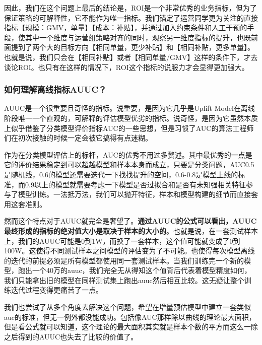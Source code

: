 \documentclass[12pt]{article}
\begin{document}
因此，我们在这个问题上最后的结论是，ROI是一个非常优秀的业务指标，但为了保证策略的可解释性，它不能作为唯一指标。我们锚定了运营同学更为关注的直接指标【规模：GMV，单量】【成本：补贴】，并通过加入约束条件和人工干预的手段，使其中一个维度与运营组策略对齐的同时，观察另一维度指标的提升，也既前面提到了两个大的目标方向【相同单量，更少补贴】和【相同补贴，更多单量】。也就是说，我们只会在【相同补贴】或者【相同单量/GMV】这样的条件下，才去谈论ROI。也只有在这样的情况下，ROI这个指标的说服力才会显得更加强大。

\subsubsection{如何理解离线指标AUUC？}
AUUC是一个很重要且奇怪的指标。说重要，是因为它几乎是Uplift Model在离线阶段唯一一个直观的，可解释的评估模型优劣的指标。说奇怪，是因为它虽然本质上似乎借鉴了分类模型评价指标AUC的一些思想，但是习惯了AUC的算法工程师们在初次接触的时候一定会被它搞得有点迷糊。

作为在分类模型评估上的标杆，AUC的优秀不用过多赘述。其中最优秀的一点是它的评价结果稳定到可以超越模型和样本本身而成立，只要是分类问题，AUC0.5是随机线，0.6的模型还需要迭代一下找找提升的空间，0.6-0.8是模型上线的标准，而0.9以上的模型就需要考虑一下模型是否过拟合和是否有未知强相关特征参与了模型训练。一法抵万法，我们可以抛开特征，样本和模型构建的细节而直接套用这套准则。

然而这个特点对于AUUC就完全是奢望了。\textbf{通过AUUC的公式可以看出，AUUC最终形成的指标的绝对值大小是取决于样本的大小的}。也就是说，在一套测试样本上，我们的AUUC可能是0到1W，而换了一套样本，这个值可能就变成了0到100W。这使得不同测试样本之间模型的评估变为了不可能。也使得每次模型离线的迭代的前提必须是所有模型都使用同一套测试样本。当我们训练完一个新的模型，跑出一个40万的auuc，我们完全无从得知这个值背后代表着模型精度如何，我们只能拿出旧的模型在同样测试集上跑出auuc然后相互比较。这无疑让整个训练迭代过程变得更痛苦了一点。

我们也尝试了从多个角度去解决这个问题，希望在增量预估模型中建立一套类似auc的标准，但无一例外都没能成功。包括像AUC那样除以曲线的理论最大面积，但是看公式就可以知道，这个理论的最大面积其实就是样本个数的平方而这么一除之后得到的AUUC也失去了比较的价值了。
\end{document}
